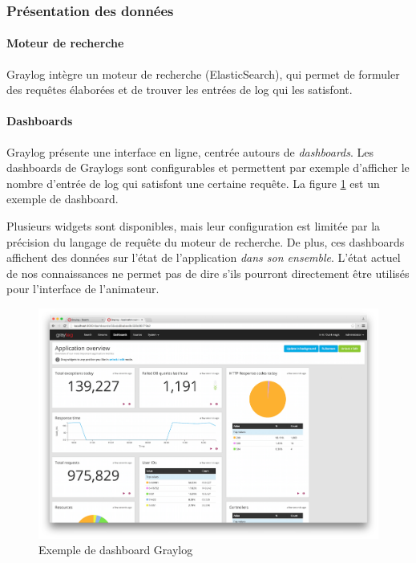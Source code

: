             \subsubsection{Présentation des données}
              
                \paragraph{Moteur de recherche}
                    Graylog intègre un moteur de recherche (ElasticSearch), qui permet de formuler des requêtes élaborées et de trouver les entrées de log qui les satisfont.

                \paragraph{Dashboards}
                    Graylog présente une interface en ligne, centrée autours de \emph{dashboards}. Les dashboards de Graylogs sont configurables et permettent par exemple d'afficher le nombre d'entrée de log qui satisfont une certaine requête. La figure \ref{img:graylog-dash} est un exemple de dashboard. 
                    
                    Plusieurs widgets sont disponibles, mais leur configuration est limitée par la précision du langage de requête du moteur de recherche. 
                    De plus, ces dashboards affichent des données sur l'état de l'application \emph{dans son ensemble}. L'état actuel de nos connaissances ne permet pas de dire s'ils pourront directement être utilisés pour l'interface de l'animateur. 
                    
                    \begin{figure}\centering
                        \includegraphics[width=\textwidth]{images/graylog-dash.png}
                        \caption{Exemple de dashboard Graylog}
                        \label{img:graylog-dash}
                    \end{figure}

